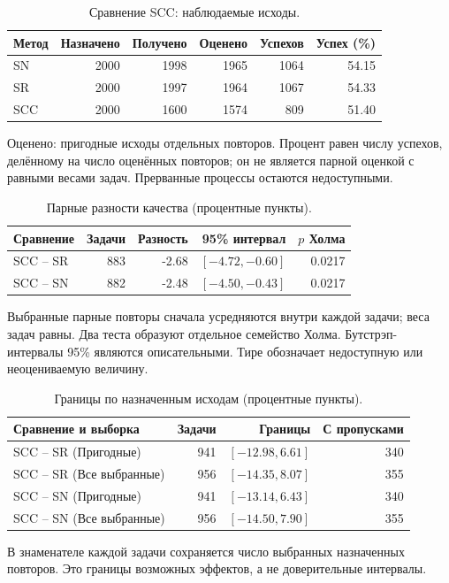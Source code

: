 \begin{table}[htbp]\centering\small
\caption{Сравнение SCC: наблюдаемые исходы.}
\label{tab:scc2000-quality}
\begin{tabular}{lrrrrr}\toprule
Метод & Назначено & Получено & Оценено & Успехов & Успех (\%)\\\midrule
SN & 2000 & 1998 & 1965 & 1064 & 54.15\\
SR & 2000 & 1997 & 1964 & 1067 & 54.33\\
SCC & 2000 & 1600 & 1574 & 809 & 51.40\\
\bottomrule\end{tabular}
\par\smallskip\noindent Оценено: пригодные исходы отдельных повторов. Процент равен числу успехов, делённому на число оценённых повторов; он не является парной оценкой с равными весами задач. Прерванные процессы остаются недоступными.
\end{table}

\begin{table}[htbp]\centering\small
\caption{Парные разности качества (процентные пункты).}
\label{tab:scc2000-contrasts}
\begin{tabular}{lrrrr}\toprule
Сравнение & Задачи & Разность & 95\% интервал & $p$ Холма\\\midrule
SCC -- SR & 883 & -2.68 & $[-4.72, -0.60]$ & 0.0217\\
SCC -- SN & 882 & -2.48 & $[-4.50, -0.43]$ & 0.0217\\
\bottomrule\end{tabular}
\par\smallskip\noindent Выбранные парные повторы сначала усредняются внутри каждой задачи; веса задач равны. Два теста образуют отдельное семейство Холма. Бутстрэп-интервалы 95\% являются описательными. Тире обозначает недоступную или неоцениваемую величину.
\end{table}

\begin{table}[htbp]\centering\small
\caption{Границы по назначенным исходам (процентные пункты).}
\label{tab:scc2000-bounds}
\begin{tabular}{lrrr}\toprule
Сравнение и выборка & Задачи & Границы & С пропусками\\\midrule
SCC -- SR (Пригодные) & 941 & $[-12.98, 6.61]$ & 340\\
SCC -- SR (Все выбранные) & 956 & $[-14.35, 8.07]$ & 355\\
SCC -- SN (Пригодные) & 941 & $[-13.14, 6.43]$ & 340\\
SCC -- SN (Все выбранные) & 956 & $[-14.50, 7.90]$ & 355\\
\bottomrule\end{tabular}
\par\smallskip\noindent В знаменателе каждой задачи сохраняется число выбранных назначенных повторов. Это границы возможных эффектов, а не доверительные интервалы.
\end{table}

